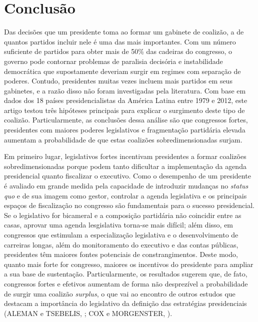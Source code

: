 \chapter{Conclusão}
\label{chap:conclusao}

Das decisões que um presidente toma ao formar um gabinete de coalizão, a de quantos partidos incluir nele é uma das mais importantes. Com um número suficiente de partidos para obter mais de 50\% das cadeiras do congresso, o governo pode contornar problemas de paralisia decisória e instabilidade democrática que supostamente deveriam surgir em regimes com separação de poderes. Contudo, presidentes muitas vezes incluem mais partidos em seus gabinetes, e a razão disso não foram investigadas pela literatura. Com base em dados dos 18 países presidencialistas da América Latina entre 1979 e 2012, este artigo testou três hipóteses principais para explicar o surgimento deste tipo de coalizão. Particularmente, as conclusões dessa análise são que congressos fortes, presidentes com maiores poderes legislativos e fragmentação partidária elevada aumentam a probabilidade de que estas coalizões sobredimensionadas surjam.

Em primeiro lugar, legislativos fortes incentivam presidentes a formar coalizões sobredimensionadas porque podem tanto dificultar a implementação da agenda presidencial quanto fiscalizar o executivo. Como o desempenho de um presidente é avaliado em grande medida pela capacidade de introduzir mudanças no \textit{status quo} e de sua imagem como gestor, controlar a agenda legislativa e os principais espaços de fiscalização no congresso são fundamentais para o sucesso presidencial. Se o legislativo for bicameral e a composição partidária não coincidir entre as casas, aprovar uma agenda lesgislativa torna-se mais difícil; além disso, em congressos que estimulam a especialização legislativa e o desenvolvimento de carreiras longas, além do monitoramento do executivo e das contas públicas, presidentes têm maiores fontes potenciais de constrangimentos. Deste modo, quanto mais forte for congresso, maiores os incentivos do presidente para ampliar a sua base de sustentação. Particularmente, os resultados sugerem que, de fato, congressos fortes e efetivos aumentam de forma não desprezível a probabilidade de surgir uma coalizão \textit{surplus}, o que vai ao encontro de outros estudos que destacam a importância do legislativo da definição das estratégias presidenciais (ALEMAN e TSEBELIS, \citeyear{aleman2011}; COX e MORGENSTER, \citeyear{cox2001}).

